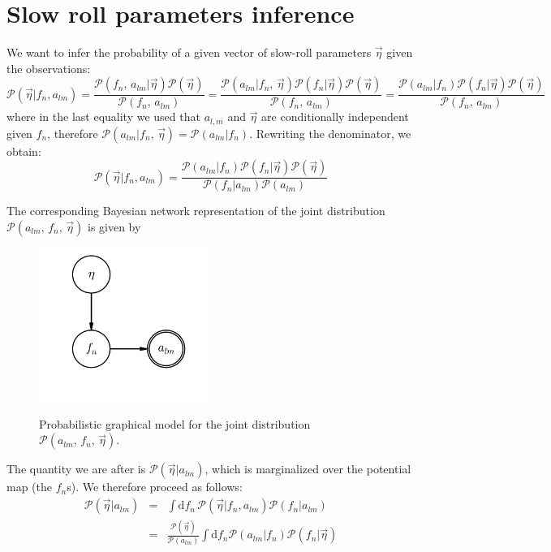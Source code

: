 \documentclass[prd, onecolumn, floatfix, letterpaper, nofootinbib, amsmath, amssymb, superscriptaddress]{revtex4}
\renewcommand{\(}{\left(}
\renewcommand{\)}{\right)}
\renewcommand{\[}{\left[}
\renewcommand{\]}{\right]}
\def\be{\begin{equation}}
\def\ee{\end{equation}}
\def\bea{\begin{eqnarray}}
\def\eea{\end{eqnarray}}
\begin{document}
 \section{Slow roll parameters inference}
 
 We want to infer the probability of a given vector of slow-roll parameters $\vec{\eta}$ given the observations:
 \be
 	\mathcal{P}(\vec{\eta}| f_n, a_{lm})=\frac{\mathcal{P}( f_n, \, a_{lm}|\vec{\eta})\mathcal{P}(\vec{\eta})}{\mathcal{P}( f_n,\, a_{lm})}=\frac{\mathcal{P}( a_{lm}| f_n,\,\vec{\eta}) \mathcal{P}( f_n|\vec{\eta})\mathcal{P}(\vec{\eta})}{\mathcal{P}( f_n, \, a_{lm})} = \frac{\mathcal{P}( a_{lm}| f_n) \mathcal{P}( f_n|\vec{\eta})\mathcal{P}(\vec{\eta})}{\mathcal{P}( f_n, \, a_{lm})}
 \ee
where in the last equality we used that $a_{l,m}$ and $\vec{\eta}$ are conditionally independent given $f_n$, therefore $\mathcal{P}( a_{lm}| f_n, \,\vec{\eta})= \mathcal{P}( a_{lm}| f_n)$. Rewriting the denominator, we obtain:
\be
	\mathcal{P}(\vec{\eta}| f_n, a_{lm})=\frac{\mathcal{P}( a_{lm}| f_n) \mathcal{P}( f_n|\vec{\eta})\mathcal{P}(\vec{\eta})}{\mathcal{P}( f_n|a_{lm} )\mathcal{P}(a_{lm})}
\ee

The corresponding Bayesian network representation of the joint distribution $\mathcal{P}(a_{lm},\,f_n,\,\vec{\eta} )$ is given by

\begin{figure}[h]
\begin{center}
\centering
\includegraphics[width=0.50\textwidth]{pgm/inflation.png}\\
\caption{\label{inflationPGM} Probabilistic graphical model for the joint distribution $\mathcal{P}(a_{lm},\,f_n,\,\vec{\eta} )$.
}

\end{center}
\end{figure}

The quantity we are after is $\mathcal{P}(\vec{\eta}| a_{lm})$, which is marginalized over the potential map (the $f_n$s). We therefore proceed as follows:
 \bea
 	\mathcal{P}(\vec{\eta}| a_{lm} )&=& \int \mathrm{d}f_n\, \mathcal{P}(\vec{\eta}| f_n, a_{lm}) \mathcal{P}(f_n | a_{lm}) 
	\\
	&=&\frac{\mathcal{P}(\vec{\eta})}{\mathcal{P}(a_{lm})}\int \mathrm{d}f_n\mathcal{P}( a_{lm}| f_n) \mathcal{P}( f_n|\vec{\eta})
 \eea
\end{document}
